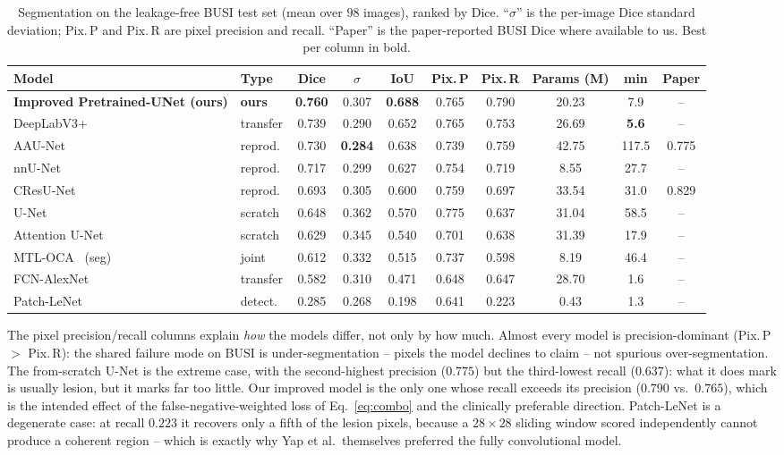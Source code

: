 \documentclass[11pt]{article}
\newcommand{\best}[1]{\textbf{#1}}
\begin{document}
\begin{table}[t]
\centering
\caption{Segmentation on the leakage-free BUSI test set (mean over $98$ images),
ranked by Dice. ``$\sigma$'' is the per-image Dice standard deviation; Pix.\,P and
Pix.\,R are pixel precision and recall. ``Paper'' is the paper-reported BUSI Dice
where available to us. Best per column in bold.}
\label{tab:seg}
\scriptsize
\setlength{\tabcolsep}{4.6pt}
\begin{tabular}{@{}llcccccccc@{}}
\toprule
Model & Type & Dice & $\sigma$ & IoU & Pix.\,P & Pix.\,R & Params (M) & min & Paper \\
\midrule
\best{Improved Pretrained-UNet (ours)} & \best{ours} & \best{0.760} & 0.307 & \best{0.688} & 0.765 & 0.790 & 20.23 & 7.9 & -- \\
DeepLabV3+~\cite{chen2018deeplabv3plus} & transfer & 0.739 & 0.290 & 0.652 & 0.765 & 0.753 & 26.69 & \best{5.6} & -- \\
AAU-Net~\cite{chen2023aaunet}           & reprod.  & 0.730 & \best{0.284} & 0.638 & 0.739 & 0.759 & 42.75 & 117.5 & 0.775 \\
nnU-Net~\cite{isensee2021nnunet}        & reprod.  & 0.717 & 0.299 & 0.627 & 0.754 & 0.719 & 8.55  & 27.7 & -- \\
CResU-Net~\cite{derakhshandeh2024cresunet}& reprod.& 0.693 & 0.305 & 0.600 & 0.759 & 0.697 & 33.54 & 31.0 & 0.829 \\
U-Net~\cite{ronneberger2015unet}        & scratch  & 0.648 & 0.362 & 0.570 & 0.775 & 0.637 & 31.04 & 58.5 & -- \\
Attention U-Net~\cite{oktay2018attentionunet}& scratch& 0.629 & 0.345 & 0.540 & 0.701 & 0.638 & 31.39 & 17.9 & -- \\
MTL-OCA~\cite{lu2025multitask} (seg)    & joint    & 0.612 & 0.332 & 0.515 & 0.737 & 0.598 & 8.19  & 46.4 & -- \\
FCN-AlexNet~\cite{yap2018cnn}           & transfer & 0.582 & 0.310 & 0.471 & 0.648 & 0.647 & 28.70 & 1.6 & -- \\
Patch-LeNet~\cite{yap2018cnn}           & detect.  & 0.285 & 0.268 & 0.198 & 0.641 & 0.223 & 0.43  & 1.3 & -- \\
\bottomrule
\end{tabular}
\end{table}

The pixel precision/recall columns explain \emph{how} the models differ, not only
by how much. Almost every model is precision-dominant (Pix.\,P $>$ Pix.\,R): the
shared failure mode on BUSI is under-segmentation -- pixels the model declines to
claim -- not spurious over-segmentation. The from-scratch U-Net is the extreme
case, with the second-highest precision ($0.775$) but the third-lowest recall
($0.637$): what it does mark is usually lesion, but it marks far too little.
Our improved model is the only one whose recall exceeds its precision
($0.790$ vs.\ $0.765$), which is the intended effect of the false-negative-weighted
loss of Eq.~\ref{eq:combo} and the clinically preferable direction. Patch-LeNet is
a degenerate case: at recall $0.223$ it recovers only a fifth of the lesion pixels,
because a $28\times28$ sliding window scored independently cannot produce a
coherent region -- which is exactly why Yap et al.\ themselves preferred the fully
convolutional model.
\end{document}

